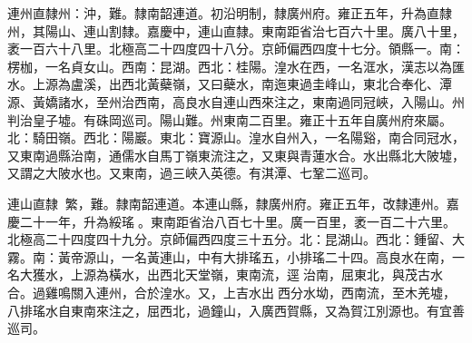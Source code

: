 \begin{pinyinscope}
連州直隸州：沖，難。隸南韶連道。初沿明制，隸廣州府。雍正五年，升為直隸州，其陽山、連山割隸。嘉慶中，連山直隸。東南距省治七百六十里。廣八十里，袤一百六十八里。北極高二十四度四十八分。京師偏西四度十七分。領縣一。南：楞枷，一名貞女山。西南：昆湖。西北：桂陽。湟水在西，一名洭水，漢志以為匯水。上源為盧溪，出西北黃蘗嶺，又曰蘗水，南迤東過圭峰山，東北合奉化、潭源、黃嬌諸水，至州治西南，高良水自連山西來注之，東南過同冠峽，入陽山。州判治皇子墟。有硃岡巡司。陽山難。州東南二百里。雍正十五年自廣州府來屬。北：騎田嶺。西北：陽巖。東北：寶源山。湟水自州入，一名陽谿，南合同冠水，又東南過縣治南，通儒水自馬丁嶺東流注之，又東與青蓮水合。水出縣北大陂墟，又謂之大陂水也。又東南，過三峽入英德。有淇潭、七鞏二巡司。

連山直隸：繁，難。隸南韶連道。本連山縣，隸廣州府。雍正五年，改隸連州。嘉慶二十一年，升為綏瑤。東南距省治八百七十里。廣一百里，袤一百二十六里。北極高二十四度四十九分。京師偏西四度三十五分。北：昆湖山。西北：鍾留、大霧。南：黃帝源山，一名黃連山，中有大排瑤五，小排瑤二十四。高良水在南，一名大獲水，上源為橫水，出西北天堂嶺，東南流，逕治南，屈東北，與茂古水合。過雞鳴關入連州，合於湟水。又，上吉水出西分水坳，西南流，至木羌墟，八排瑤水自東南來注之，屈西北，過鐘山，入廣西賀縣，又為賀江別源也。有宜善巡司。


\end{pinyinscope}
